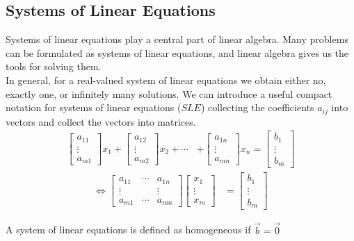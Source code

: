\subsection*{Systems of Linear Equations}
Systems of linear equations play a central part of linear algebra. Many problems can be formulated as systems of linear equations, and linear algebra gives us the tools for solving them.\\
In general, for a real-valued system of linear equations we obtain either no, exactly one, or infinitely many solutions. We can introduce a useful compact notation for systems of linear equations ($SLE$) collecting the coefficients $a_{ij}$ into vectors and collect the vectors into matrices.
\begin{align}
    \begin{bmatrix}
        a_{11}\\
        \vdots\\
        a_{m1}
    \end{bmatrix} x_1
    + \begin{bmatrix}
        a_{12}\\
        \vdots\\
        a_{m2}
    \end{bmatrix} x_2
    +\cdots&+
    \begin{bmatrix}
        a_{1n}\\
        \vdots\\
        a_{mn}
    \end{bmatrix} x_n
    = \begin{bmatrix}
        b_{1}\\
        \vdots\\
        b_{m}
    \end{bmatrix}
\end{align}
\begin{align}
    \Longleftrightarrow
    \begin{bmatrix}
        a_{11}& \cdots & a_{1n}\\
        \vdots& & \vdots\\
        a_{m1}& \cdots & a_{mn}
    \end{bmatrix}
    \begin{bmatrix}
        x_{1}\\
        \vdots\\
        x_{m}
    \end{bmatrix}
    &= \begin{bmatrix}
        b_{1}\\
        \vdots\\
        b_{m}
    \end{bmatrix}
\end{align}
\begin{definition}
    A system of linear equations is defined as homogeneous if $\vec{b} = \vec{0}$
\end{definition}

